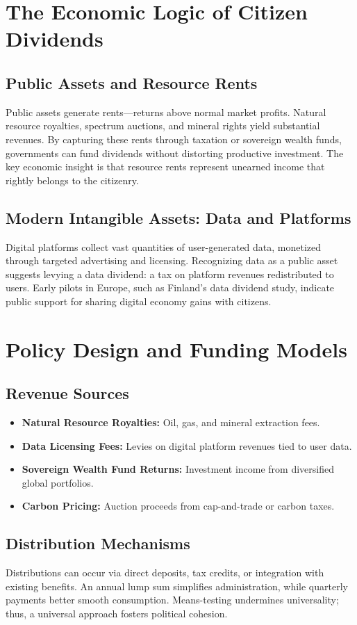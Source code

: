 \documentclass[11pt]{article}
\begin{document}
\section{The Economic Logic of Citizen Dividends}
\subsection{Public Assets and Resource Rents}
Public assets generate rents—returns above normal market profits. Natural resource royalties, spectrum auctions, and mineral rights yield substantial revenues. By capturing these rents through taxation or sovereign wealth funds, governments can fund dividends without distorting productive investment. The key economic insight is that resource rents represent unearned income that rightly belongs to the citizenry.

\subsection{Modern Intangible Assets: Data and Platforms}
Digital platforms collect vast quantities of user-generated data, monetized through targeted advertising and licensing. Recognizing data as a public asset suggests levying a data dividend: a tax on platform revenues redistributed to users. Early pilots in Europe, such as Finland’s data dividend study, indicate public support for sharing digital economy gains with citizens.

\section{Policy Design and Funding Models}
\subsection{Revenue Sources}
\begin{itemize}
\item \textbf{Natural Resource Royalties:} Oil, gas, and mineral extraction fees.
\item \textbf{Data Licensing Fees:} Levies on digital platform revenues tied to user data.
\item \textbf{Sovereign Wealth Fund Returns:} Investment income from diversified global portfolios.
\item \textbf{Carbon Pricing:} Auction proceeds from cap-and-trade or carbon taxes.
\end{itemize}

\subsection{Distribution Mechanisms}
Distributions can occur via direct deposits, tax credits, or integration with existing benefits. An annual lump sum simplifies administration, while quarterly payments better smooth consumption. Means-testing undermines universality; thus, a universal approach fosters political cohesion.
\end{document}
